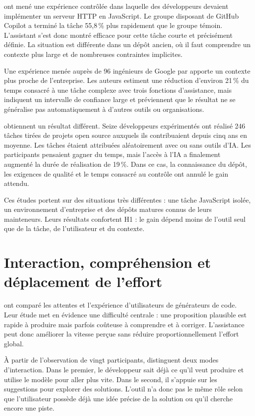 \documentclass[12pt,a4paper,oneside]{report}
\newcommand{\taux}[1]{#1\,\%}
\begin{document}
\textcite{peng2023productivity} ont mené une expérience contrôlée dans laquelle des développeurs devaient implémenter un serveur HTTP en JavaScript. Le groupe disposant de GitHub Copilot a terminé la tâche \taux{55,8} plus rapidement que le groupe témoin. L'assistant s'est donc montré efficace pour cette tâche courte et précisément définie. La situation est différente dans un dépôt ancien, où il faut comprendre un contexte plus large et de nombreuses contraintes implicites.

Une expérience menée auprès de 96 ingénieurs de Google par \textcite{paradis2024enterprise} apporte un contexte plus proche de l'entreprise. Les auteurs estiment une réduction d'environ \taux{21} du temps consacré à une tâche complexe avec trois fonctions d'assistance, mais indiquent un intervalle de confiance large et préviennent que le résultat ne se généralise pas automatiquement à d'autres outils ou organisations.

\textcite{becker2025productivity} obtiennent un résultat différent. Seize développeurs expérimentés ont réalisé 246 tâches tirées de projets open source auxquels ils contribuaient depuis cinq ans en moyenne. Les tâches étaient attribuées aléatoirement avec ou sans outils d'IA. Les participants pensaient gagner du temps, mais l'accès à l'IA a finalement augmenté la durée de réalisation de \taux{19}. Dans ce cas, la connaissance du dépôt, les exigences de qualité et le temps consacré au contrôle ont annulé le gain attendu.

Ces études portent sur des situations très différentes : une tâche JavaScript isolée, un environnement d'entreprise et des dépôts matures connus de leurs mainteneurs. Leurs résultats confortent H1 : le gain dépend moins de l'outil seul que de la tâche, de l'utilisateur et du contexte.

\section{Interaction, compréhension et déplacement de l'effort}

\textcite{vaithilingam2022expectation} ont comparé les attentes et l'expérience d'utilisateurs de générateurs de code. Leur étude met en évidence une difficulté centrale : une proposition plausible est rapide à produire mais parfois coûteuse à comprendre et à corriger. L'assistance peut donc améliorer la vitesse perçue sans réduire proportionnellement l'effort global.

À partir de l'observation de vingt participants, \textcite{barke2023grounded} distinguent deux modes d'interaction. Dans le premier, le développeur sait déjà ce qu'il veut produire et utilise le modèle pour aller plus vite. Dans le second, il s'appuie sur les suggestions pour explorer des solutions. L'outil n'a donc pas le même rôle selon que l'utilisateur possède déjà une idée précise de la solution ou qu'il cherche encore une piste.
\end{document}
